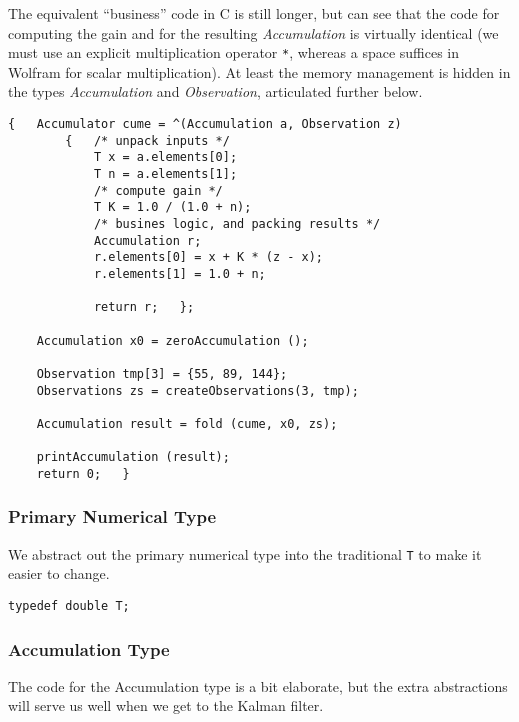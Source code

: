 \documentclass[10pt,oneside,x11names]{article}
\begin{document}
The equivalent ``business'' code in C is still longer, but can see that the code
for computing the gain and for the resulting \emph{Accumulation} is virtually
identical (we must use an explicit multiplication operator \texttt{*}, whereas a space
suffices in Wolfram for scalar multiplication). At least the memory management
is hidden in the types \emph{Accumulation} and \emph{Observation}, articulated further
below.

\begin{verbatim}
{   Accumulator cume = ^(Accumulation a, Observation z)
        {   /* unpack inputs */
            T x = a.elements[0];
            T n = a.elements[1];
            /* compute gain */
            T K = 1.0 / (1.0 + n);
            /* busines logic, and packing results */
            Accumulation r;
            r.elements[0] = x + K * (z - x);
            r.elements[1] = 1.0 + n;

            return r;   };

    Accumulation x0 = zeroAccumulation ();

    Observation tmp[3] = {55, 89, 144};
    Observations zs = createObservations(3, tmp);

    Accumulation result = fold (cume, x0, zs);

    printAccumulation (result);
    return 0;   }
\end{verbatim}

\subsubsection{Primary Numerical Type}
\label{sec:orgheadline5}

We abstract out the primary numerical type into the traditional \texttt{T} to make it
easier to change.

\begin{verbatim}
typedef double T;
\end{verbatim}

\subsubsection{Accumulation Type}
\label{sec:orgheadline6}

The code for the Accumulation type is a bit elaborate, but the extra
abstractions will serve us well when we get to the Kalman filter.
\end{document}
